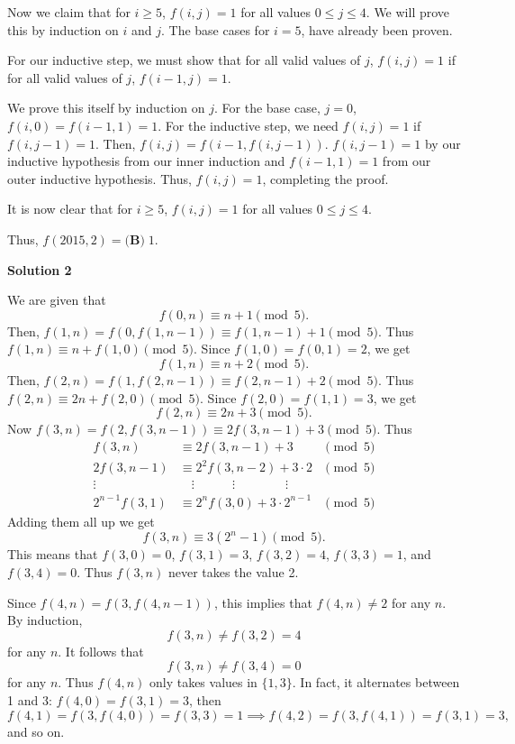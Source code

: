\begin{enumerate}
 Now we claim that for $i \ge 5$, $f(i,j) = 1$ for all values $0 \le j \le 4$.  We will prove this by induction on $i$ and $j$.  The base cases for $i = 5$, have already been proven.

 For our inductive step, we must show that for all valid values of $j$, $f(i, j) = 1$ if for all valid values of $j$, $f(i - 1, j) = 1$.

 We prove this itself by induction on $j$.  For the base case, $j=0$, $f(i, 0) = f(i-1, 1) = 1$.  For the inductive step, we need $f(i, j) = 1$ if $f(i, j-1) = 1$.  Then, $f(i, j) = f(i-1, f(i, j-1)).$ $f(i, j-1) = 1$ by our inductive hypothesis from our inner induction and $f(i-1, 1) = 1$ from our outer inductive hypothesis.  Thus, $f(i, j) = 1$, completing the proof.

 It is now clear that for $i \ge 5$, $f(i,j) = 1$ for all values $0 \le j \le 4$.

 Thus, $f(2015,2) = \boxed{\textbf{(B)} \; 1}$.

 



\textbf{Solution 2}

We are given that 
 \[f(0,n) \equiv n+1\pmod{5} .\]Then, $f(1,n) = f(0, f(1, n-1)) \equiv f(1,n-1) + 1\pmod{5}$. Thus $f(1,n) \equiv n+f(1,0)\pmod{5}$. Since $f(1,0)=f(0,1)=2$, we get 
 \[f(1,n) \equiv n+2\pmod{5} .\]Then, $f(2,n) = f(1, f(2, n-1)) \equiv f(2,n-1) + 2\pmod{5}$. Thus $f(2,n) \equiv 2n+f(2,0)\pmod{5}$. Since $f(2,0)=f(1,1)=3$, we get 
 \[f(2,n) \equiv 2n+3\pmod{5} .\]Now $f(3,n) = f(2, f(3, n-1)) \equiv 2f(3,n-1) + 3\pmod{5}$. Thus 
 \begin{align*}     f(3,n) &\equiv 2f(3,n-1) + 3 &\pmod{5} \\     2f(3,n-1) &\equiv 2^2f(3,n-2) + 3\cdot 2 &\pmod{5} \\     \vdots \qquad &\quad\vdots \quad\qquad \vdots \qquad\qquad \vdots &\\     2^{n-1}f(3,1) &\equiv 2^nf(3,0) + 3\cdot 2^{n-1} &\pmod{5}  \end{align*}
Adding them all up we get
 \[f(3,n) \equiv 3(2^n-1)\pmod{5} .\]This means that $f(3,0)=0$, $f(3,1)=3$, $f(3,2)=4$, $f(3,3)=1$, and $f(3,4)=0$. Thus $f(3,n)$ never takes the value 2. 

 Since $f(4,n)=f(3,f(4,n-1))$, this implies that $f(4,n) \neq 2$ for any $n$. By induction, 
 \[f(3,n) \neq f(3,2) = 4\] for any $n$. It follows that 
 \[f(3,n) \neq f(3,4) = 0\] for any $n$. Thus $f(4,n)$ only takes values in $\{1,3\}$. In fact, it alternates between 1 and 3: $f(4,0)=f(3,1)=3$, then  
 \[f(4,1)=f(3,f(4,0))=f(3,3)=1\implies f(4,2)=f(3,f(4,1))=f(3,1)=3,\] and so on. 


\end{enumerate}
